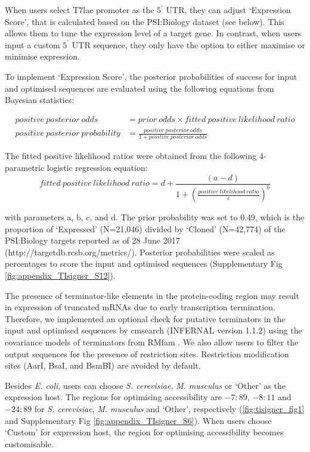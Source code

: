 When users select T7lac promoter as the $5^{\prime}$ UTR, they can adjust ‘Expression Score’, that is calculated based on the PSI:Biology dataset (see below). This allows them to tune the expression level of a target gene. In contrast, when users input a custom $5^{\prime}$ UTR sequence, they only have the option to either maximise or minimise expression.

To implement ‘Expression Score’, the posterior probabilities of success for input and optimised sequences are evaluated using the following equations from Bayesian statistics:

\begin{equation*}
\begin{split}
positive\ posterior\ odds &= prior\ odds \times fitted\ positive\ likelihood\ ratio \\
positive\ posterior\ probability &= \frac{ positive\ posterior\ odds}{1 + positive\ posterior\ odds}
\end{split}
\end{equation*}


The fitted positive likelihood ratios were obtained from the following 4-parametric logistic regression equation:
\begin{equation*}
fitted\ positive\ likelihood\ ratio = d + \frac{(a-d)}{1+(\frac{positive\ likelihood\ ratio}{c})^b}
\end{equation*}

with parameters a, b, c, and d. The prior probability was set to 0.49, which is the proportion of ‘Expressed’ (N=21,046) divided by ‘Cloned’ (N=42,774) of the PSI:Biology targets reported as of 28 June 2017 (http://targetdb.rcsb.org/metrics/). Posterior probabilities were scaled as percentages to score the input and optimised sequences (Supplementary Fig \ref{fig:appendix_TIsigner_S12}).

The presence of terminator-like elements \cite{Chen2013-um} in the protein-coding region may result in expression of truncated mRNAs due to early transcription termination. Therefore, we implemented an optional check for putative terminators in the input and optimised sequences by cmsearch (INFERNAL version 1.1.2) \cite{Nawrocki2013-te} using the covariance models of terminators from RMfam \cite{Gardner2015-ui,Kalvari2018-un}. We also allow users to filter the output sequences for the presence of restriction sites. Restriction modification sites (AarI, BsaI, and BsmBI) are avoided by default.

Besides \textit{E. coli}, users can choose \textit{S. cerevisiae}, \textit{M. musculus} or ‘Other’ as the expression host. The regions for optimising accessibility are $−7:89$, $−8:11$ and $−24:89$ for \textit{S. cerevisiae}, \textit{M. musculus} and ‘Other’, respectively (\ref{fig:tisigner_fig1} and Supplementary Fig \ref{fig:appendix_TIsigner_S6}). When users choose ‘Custom’ for expression host, the region for optimising accessibility becomes customisable.

